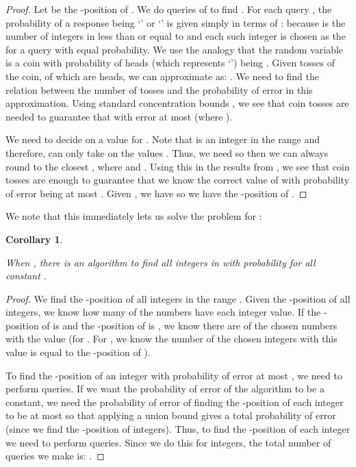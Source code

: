 \documentclass[12pt]{article}
\newtheorem{corollary}[theorem]{Corollary}
\begin{document}
\begin{proof}
Let  be the -position of . We do  queries of  to find . For each query , the probability of a response being `' or `' is given simply in terms of :   because  is the number of integers in  less than or equal to  and each such integer is chosen as the  for a query with equal probability. We use the analogy that the random variable  is a coin with probability of heads (which represents `') being . Given  tosses of the coin, of which  are heads, we can approximate  as: . We need to find the relation between the number of tosses  and the probability of error in this approximation. Using standard concentration bounds \cite{Raginsky}, we see that  coin tosses are needed to guarantee that  with error at most  (where ). 

We need to decide on a value for . Note that  is an integer in the range  and therefore,  can only take on the values . Thus, we need  so then we can always round  to the closest , where  and . Using this in the results from \cite{Raginsky}, we see that  coin tosses are enough to guarantee that we know the correct value of  with probability of error being at most . Given , we have  so we have the -position of . 
\end{proof}

We note that this immediately lets us solve the problem for :

\begin{corollary} \label{cor:bigksolution}

When , there is an  algorithm to find all  integers in  with probability  for all constant .

\end{corollary}

\begin{proof}

We find the -position of all  integers in the range . Given the -position of all  integers, we know how many of the  numbers have each integer value. If the -position of  is  and the -position of  is , we know there are  of the chosen numbers with the value  (for . For , we know the number of the chosen integers with this value is equal to the -position of ).

To find the -position of an integer with probability of error at most , we need to perform  queries. If we want the probability of error of the algorithm to be a constant, we need the probability of error of finding the -position of each integer to be at most  so that applying a union bound gives a total probability of error  (since we find the -position of  integers). Thus, to find the -position of each integer we need to perform  queries. Since we do this for  integers, the total number of queries we make is: .
\end{proof}
\end{document}
